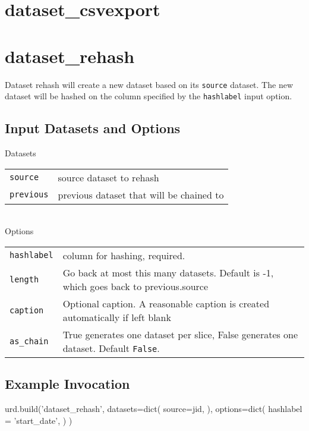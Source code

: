 \clearpage
\section{dataset\_csvexport}

\clearpage
\section{dataset\_rehash}

Dataset rehash will create a new dataset based on its \texttt{source}
dataset.  The new dataset will be hashed on the column specified by
the \texttt{hashlabel} input option.

\subsection{Input Datasets and Options}

Datasets\\

\begin{tabular}{ll}
  \texttt{source}   & source dataset to rehash\\
  \texttt{previous} & previous dataset that will be chained to\\
\end{tabular}\\


\noindent Options\\

\begin{tabular}{ll}
  \texttt{hashlabel} & column for hashing, required.\\
  \texttt{length}    & Go back at most this many datasets. Default is -1, which goes back to previous.source\\
  \texttt{caption}   & Optional caption.  A reasonable caption is created automatically if left blank\\
  \texttt{as\_chain}  & True generates one dataset per slice, False generates one dataset.  Default \texttt{False}.\\
\end{tabular}


\subsection{Example Invocation}
\begin{python}
urd.build('dataset_rehash',
  datasets=dict(
    source=jid,
  ), 
  options=dict(
    hashlabel = 'start_date',
  )
)
\end{python}



